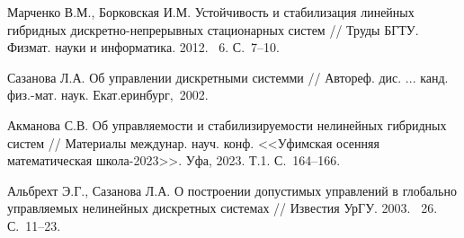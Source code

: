 \begin{thebibliography}{9} %
 Марченко В.М., Борковская И.М. Устойчивость и стабилизация линейных гибридных дискретно-непрерывных стационарных систем // Труды БГТУ. Физмат. науки и информатика. 2012. \textnumero~6.
С.~7--10. 

 Сазанова Л.А. Об управлении дискретными  системми //   Автореф. дис. ... канд. физ.-мат. наук. Екат.еринбург,~2002.

 
 Акманова С.В. Об управляемости и стабилизируемости нелинейных гибридных систем // Материалы междунар. науч. конф.
<<Уфимская осенняя математическая школа-2023>>. Уфа, 2023. Т.1.  С.~164--166.

Альбрехт Э.Г., Сазанова Л.А. О построении допустимых управлений  в глобально управляемых  нелинейных дискретных системах // Известия УрГУ. 2003. \textnumero~26. С.~11--23. 

\end{thebibliography}







%
